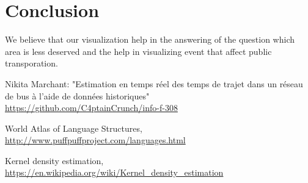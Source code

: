\documentclass[11pt]{article}%
\begin{document}
\section{Conclusion}
We believe that our visualization help in the answering of the question which area is less deserved and the help in visualizing event that affect public transporation. 

 
\begin{thebibliography}{9}
 
Nikita Marchant: "Estimation en temps réel des temps de trajet dans un réseau de bus à l'aide de données historiques"
\\\url{https://github.com/C4ptainCrunch/info-f-308}

World Atlas of Language Structures,
\\\url{http://www.puffpuffproject.com/languages.html}

Kernel density estimation,
\\\url{https://en.wikipedia.org/wiki/Kernel_density_estimation}



\end{thebibliography}
\end{document}
